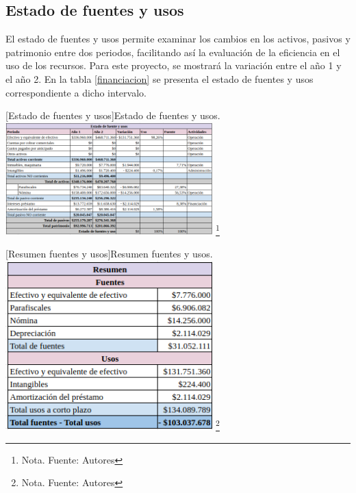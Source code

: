 \subsection{Estado de fuentes y usos}

El estado de fuentes y usos permite examinar los cambios en los activos, pasivos y patrimonio entre dos periodos, facilitando así la evaluación de la eficiencia en el uso de los recursos. Para este proyecto, se mostrará la variación entre el año 1 y el año 2. En la tabla \ref{financiacion} se presenta el estado de fuentes y usos correspondiente a dicho intervalo.

\vspace{2mm}
\begin{minipage}{0.9\textwidth}
\centering
{}[Estado de fuentes y usos]{Estado de fuentes y usos.}
\label{financiacion}
\includegraphics[width=0.6\textwidth]{Content/Images/AF/EstadosDeFuenteYUsos.png}
\footnote{Nota. \textup{Fuente: Autores}}
\end{minipage}

\vspace{2mm}
\begin{minipage}{0.9\textwidth}
\centering
{}[Resumen fuentes y usos]{Resumen fuentes y usos.}
\label{resumen}
\includegraphics[width=0.6\textwidth]{Content/Images/AF/EstadosDeFuenteYUsosResumen.png}
\footnote{Nota. \textup{Fuente: Autores}}
\end{minipage}
